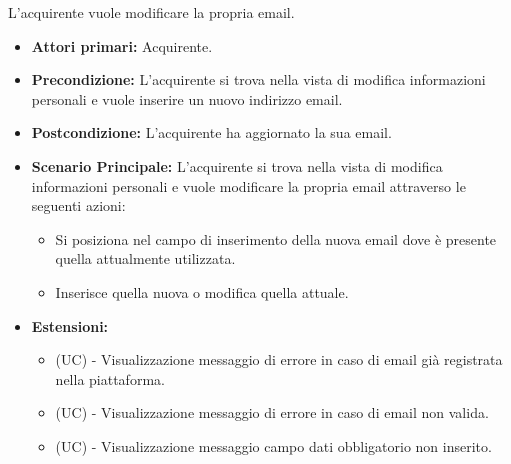 L'acquirente vuole modificare la propria email.
\begin{itemize}
    \item \textbf{Attori primari:} Acquirente.
    \item \textbf{Precondizione:} L'acquirente si trova nella vista di modifica informazioni personali e vuole inserire un nuovo indirizzo email.
    \item \textbf{Postcondizione:} L'acquirente ha aggiornato la sua email.
    \item \textbf{Scenario Principale:} L'acquirente si trova nella vista di modifica informazioni personali e vuole modificare la propria email attraverso le seguenti azioni:
        \begin{itemize}
            \item Si posiziona nel campo di inserimento della nuova email dove è presente quella attualmente utilizzata.
            \item Inserisce quella nuova o modifica quella attuale.
        \end{itemize}
    \item \textbf{Estensioni:}
    \begin{itemize}
        \item (UC) - Visualizzazione messaggio di errore in caso di email già registrata nella piattaforma.
        \item (UC) - Visualizzazione messaggio di errore in caso di email non valida.
        \item (UC) - Visualizzazione messaggio campo dati obbligatorio non inserito.
    \end{itemize}
\end{itemize}

